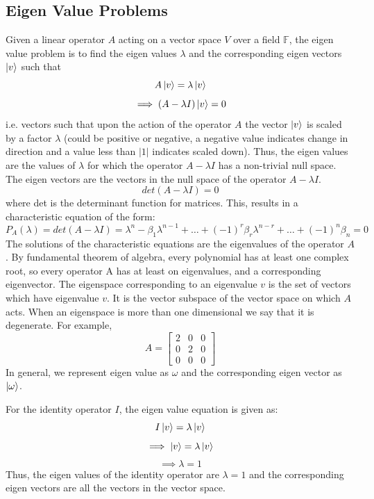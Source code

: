 \subsection{Eigen Value Problems}
Given a linear operator $A$ acting on a vector space $V$ over a field $\mathbb{F}$, the eigen value problem is to find the eigen values $\lambda$ and the corresponding eigen vectors $\ket{v}$ such that
\[A\ket{v}=\lambda\ket{v}\]
\[\implies (A-\lambda I)\ket{v}=0\]
i.e. vectors such that upon the action of the operator $A$ the vector $\ket{v}$ is scaled by a factor $\lambda$ (could be positive or negative, a negative value indicates change in direction and a value less than $|1|$ indicates scaled
down).
Thus, the eigen values are the values of $\lambda$ for which the operator $A-\lambda I$ has a non-trivial null space. The eigen vectors are the vectors in the null space of the operator $A-\lambda I$.
\[det(A-\lambda I)=0\]
where det is the determinant function for matrices. This, results in a characteristic equation of the form:
\[ P_A(\lambda)=det(A-\lambda I)=\lambda^n - \beta_1\lambda^{n-1} + \ldots + (-1)^{r} \beta_r\lambda^{n-r}+\ldots + (-1)^n\beta_n = 0 \]
The solutions of the characteristic equations are the eigenvalues of the operator $A$. By fundamental theorem of algebra, every polynomial has at least one complex root, so every operator A has at least on eigenvalues, and a corresponding eigenvector. The eigenspace corresponding to an eigenvalue $v$ is the set of vectors which have eigenvalue $v$. It is the vector subspace of the vector space on which $A$ acts. When an eigenspace is more than one dimensional we say that it is degenerate. For example, 
\[
A=\begin{bmatrix} 2 & 0 & 0 \\ 0& 2 & 0 \\ 0 & 0 & 0 \end{bmatrix}
\]
In general, we represent eigen value as $\omega$ and the corresponding eigen vector as $\ket{\omega}$.

\begin{example}
    For the identity operator $I$, the eigen value equation is given as:
    \[I\ket{v}=\lambda\ket{v}\]
    \[\implies \ket{v}=\lambda\ket{v}\]
    \[\implies \lambda=1\]
    Thus, the eigen values of the identity operator are $\lambda=1$ and the corresponding eigen vectors are all the vectors in the vector space.
\end{example}


